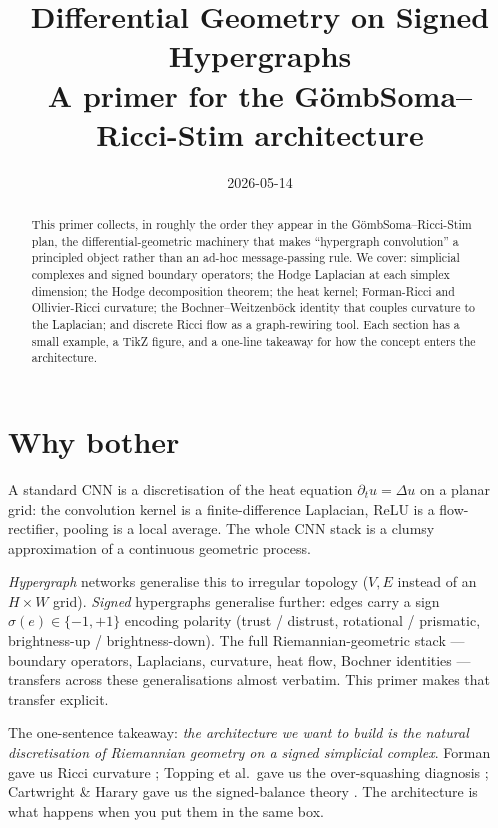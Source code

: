 \documentclass[11pt,a4paper]{article}
\title{Differential Geometry on Signed Hypergraphs \\
       \large{A primer for the G\"ombSoma--Ricci-Stim architecture}}
\date{2026-05-14}
\author{}
\newcommand{\sig}{\ensuremath{\sigma}}
\begin{document}
\maketitle
\thispagestyle{fancy}

\begin{abstract}
\noindent This primer collects, in roughly the order they appear in the
G\"ombSoma--Ricci-Stim plan, the differential-geometric machinery that
makes ``hypergraph convolution'' a principled object rather than an
ad-hoc message-passing rule. We cover: simplicial complexes and signed
boundary operators; the Hodge Laplacian at each simplex dimension; the
Hodge decomposition theorem; the heat kernel; Forman-Ricci and
Ollivier-Ricci curvature; the Bochner--Weitzenböck identity that
couples curvature to the Laplacian; and discrete Ricci flow as a
graph-rewiring tool. Each section has a small example, a TikZ figure,
and a one-line takeaway for how the concept enters the architecture.
\end{abstract}

\section{Why bother}

A standard CNN is a discretisation of the heat equation
$\partial_t u = \Delta u$ on a planar grid: the convolution kernel is a
finite-difference Laplacian, ReLU is a flow-rectifier, pooling is a
local average. The whole CNN stack is a clumsy approximation of a
continuous geometric process.

\emph{Hypergraph} networks generalise this to irregular topology
($V, E$ instead of an $H \times W$ grid). \emph{Signed} hypergraphs
generalise further: edges carry a sign $\sig(e) \in \{-1, +1\}$
encoding polarity (trust / distrust, rotational / prismatic,
brightness-up / brightness-down). The full Riemannian-geometric stack
--- boundary operators, Laplacians, curvature, heat flow, Bochner
identities --- transfers across these generalisations almost verbatim.
This primer makes that transfer explicit.

The one-sentence takeaway: \emph{the architecture we want to build is
the natural discretisation of Riemannian geometry on a signed
simplicial complex}. Forman gave us Ricci curvature
\cite{Forman2003}; Topping et al.\ gave us the over-squashing diagnosis
\cite{Topping2022}; Cartwright \& Harary gave us the signed-balance
theory \cite{Cartwright1956}. The architecture is what happens when you
put them in the same box.
\end{document}
